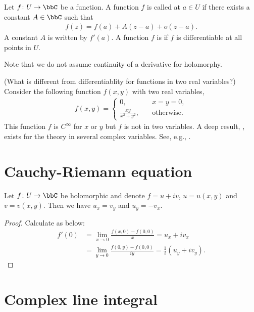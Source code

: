\documentclass[openany, a4paper, oneside]{jsbook}
\begin{document}
\begin{defn}
 Let $f \colon U \to \bbC$ be a function.
 A function $f$ is called  at
 $a \in U$ if there exists a constant $A \in \bbC$ such that
 \begin{align}
  f (z)
  =
  f (a) + A (z-a) + o (z-a).
 \end{align}
 A constant $A$ is written by $f'(a)$.
 A function $f$ is  if $f$ is differentiable at all points in $U$.
\end{defn}
Note that we do not assume continuity of a derivative for holomorphy.
\begin{rem}\textup{(What is different from differentiablity for functions in two real variables?)}
 Consider the following function $f (x, y)$ with two real variables,
\begin{align}
 f (x, y) =
 \begin{cases}
  0, &\quad x=y=0, \\
  \frac{xy}{x^2+y^2}, &\quad \mathrm{otherwise}.
 \end{cases}
\end{align}
This function $f$ is $C^{\infty}$ for $x$ or $y$ but $f$ is not  in two variables.
A deep result, , exists for the theory in several complex variables.
See, e.g., \cite{ToshioNishino1}.
\end{rem}
\section{Cauchy-Riemann equation}

\begin{thm}
 Let $f \colon U \to \bbC$ be holomorphic and denote $f = u + iv$, $u=u (x,y)$ and $v=v (x,y)$.
 Then we have $u_x = v_y$ and $u_y = - v_x$.
\end{thm}
\begin{proof}
 Calculate as below:
 \begin{align}
  f'(0)
  &=
  \lim_{x \to 0} \frac{f (x,0) - f (0,0)}{x} = u_x + iv_x \\
  &=
  \lim_{y \to 0} \frac{f (0,y) - f (0,0)}{iy} = \frac{1}{i} (u_y + iv_y).
 \end{align}
\end{proof}
\section{Complex line integral}
\end{document}
